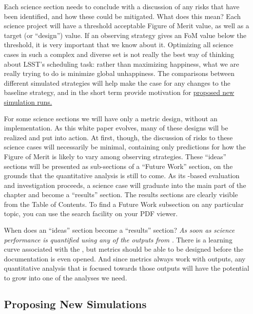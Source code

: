 Each science section needs to conclude with a discussion of any risks
that have been identified, and how these could be mitigated. What does
this mean? Each science project will have a threshold acceptable
Figure of Merit value, as well as a target (or ``design'') value.  If
an observing strategy gives an FoM value below the threshold, it
is very important that we know about it.  Optimizing all science cases
in such a complex and diverse set is not really the best way of
thinking about LSST's scheduling task: rather than maximizing
happiness, what we are really trying to do is minimize global
unhappiness.
The comparisons between different simulated strategies will help make
the case for any changes to the baseline strategy, and in the short term
provide motivation for
\href{https://github.com/LSSTScienceCollaborations/ObservingStrategy/blob/master/opsim/README.md}{proposed
new \OpSim simulation runs.}

For some science sections we will have only a metric design, without an
implementation. As this white paper  evolves, many of these designs will
be realized and put into action. At first, though, the discussion of
risks to these science cases will necessarily be minimal, containing
only predictions for how the Figure of Merit is likely to vary among
observing strategies. These ``ideas'' sections will be presented as
sub-sections of a ``Future Work'' section, on the grounds that the
quantitative analysis is still to come. As its \MAF-based evaluation and
investigation proceeds, a science case will graduate into the main
part of the chapter and become a ``results'' section. The results
sections are clearly visible from the Table of
Contents. To find a Future Work subsection on any particular topic,
you can use the search facility on your PDF viewer.

When does an  ``ideas'' section become a ``results'' section? {\it As
soon as science  performance is quantified using any of the outputs from
\OpSim.} There is  a learning curve associated with the \MAF, but
metrics should be able to be designed before the \MAF documentation is
even opened. And since \MAF metrics always work with \OpSim outputs, any
quantitative analysis that is focused towards those outputs will have
the potential to grow into one of the \MAF analyses we need.


\subsection{Proposing New Simulations}

